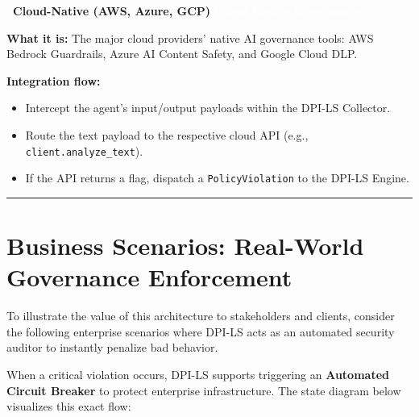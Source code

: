 \documentclass[11pt,a4paper]{article}
\begin{document}
\vspace{0.5cm}
\noindent\textbf{\large \faCloud\ Cloud-Native (AWS, Azure, GCP)} \quad \colorbox{dpiblue}{\textcolor{white}{\small \textbf{Cloud-Native Governance}}}\\[0.2cm]
\begin{tcolorbox}[enhanced, colback=white, colframe=dpiblue, boxrule=0pt, leftrule=3pt, sharp corners, top=2mm, bottom=2mm]
\textbf{What it is:} The major cloud providers' native AI governance tools: AWS Bedrock Guardrails, Azure AI Content Safety, and Google Cloud DLP.

\textbf{Integration flow:}
\begin{itemize}
    \item[\textcolor{dpiblue}{\textbf{1.}}] Intercept the agent's input/output payloads within the DPI-LS Collector.
    \item[\textcolor{dpiblue}{\textbf{2.}}] Route the text payload to the respective cloud API (e.g., \texttt{client.analyze\_text}).
    \item[\textcolor{dpiblue}{\textbf{3.}}] If the API returns a flag, dispatch a \texttt{PolicyViolation} to the DPI-LS Engine.
\end{itemize}
\end{tcolorbox}

\vspace{0.5cm}
\hrule
\vspace{0.5cm}

\section{Business Scenarios: Real-World Governance Enforcement}

To illustrate the value of this architecture to stakeholders and clients, consider the following enterprise scenarios where DPI-LS acts as an automated security auditor to instantly penalize bad behavior. 

When a critical violation occurs, DPI-LS supports triggering an \textbf{Automated Circuit Breaker} to protect enterprise infrastructure. The state diagram below visualizes this exact flow:
\end{document}
